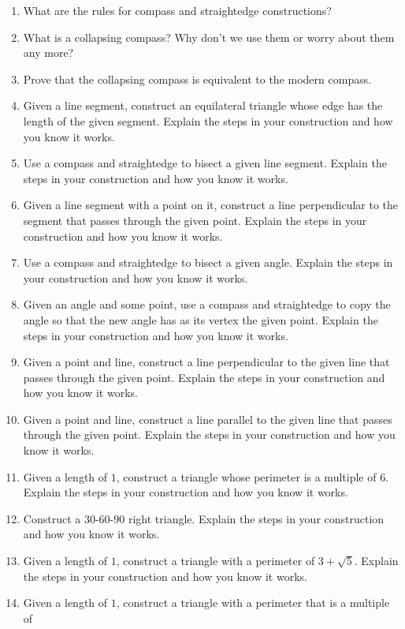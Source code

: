 \begin{problems}
\begin{enumerate}
\item What are the rules for compass and straightedge constructions?
\item What is a collapsing compass? Why don't we use them or worry about them any more?
\item Prove that the collapsing compass is equivalent to the modern compass.
\item Given a line segment, construct an equilateral triangle whose edge has the length of the given segment. Explain the steps in your construction and how you know it works.
\item Use a compass and straightedge to bisect a given line segment. Explain the steps in your construction and how you know it works.
\item Given a line segment with a point on it, construct a line perpendicular to the segment that passes through the given point. Explain the steps in your construction and how you know it works.
\item Use a compass and straightedge to bisect a given angle. Explain the steps in your construction and how you know it works.
\item Given an angle and some point, use a compass and straightedge to copy the angle so that the new angle has as its vertex the given point. Explain the steps in your construction and how you know it works.
\item Given a point and line, construct a line perpendicular to the given line that passes through the given point. Explain the steps in your construction and how you know it works.
\item Given a point and line, construct a line parallel to the given line that passes through the given point. Explain the steps in your construction and how you know it works.
\item Given a length of $1$, construct a triangle whose perimeter is a
  multiple of $6$. Explain the steps in your construction and how you know it works.
\item Construct a $30$-$60$-$90$ right triangle. Explain the steps in your
  construction and how you know it works.
\item Given a length of $1$, construct a triangle with a perimeter of
  $3 + \sqrt{5}$. Explain the steps in your construction and how you know it works.
\item Given a length of $1$, construct a triangle with a perimeter that is a multiple of

\end{enumerate}
\end{problems}
